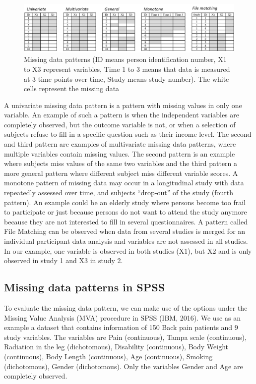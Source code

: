 \documentclass[]{book}
\theoremstyle{definition}
\theoremstyle{definition}
\theoremstyle{definition}
\theoremstyle{remark}
\begin{document}
\begin{figure}

{\centering \includegraphics[width=0.9\linewidth]{images/fig2.2} 

}

\caption{Missing data patterns (ID means person identification number, X1 to X3 represent variables, Time 1 to 3 means that data is measured at 3 time points over time, Study means study number). The white cells represent the missing data}\label{fig:fig2-2}
\end{figure}

A univariate missing data pattern is a pattern with missing values in
only one variable. An example of such a pattern is when the independent
variables are completely observed, but the outcome variable is not, or
when a selection of subjects refuse to fill in a specific question such
as their income level. The second and third pattern are examples of
multivariate missing data patterns, where multiple variables contain
missing values. The second pattern is an example where subjects miss
values of the same two variables and the third pattern a more general
pattern where different subject miss different variable scores. A
monotone pattern of missing data may occur in a longitudinal study with
data repeatedly assessed over time, and subjects ``drop-out'' of the
study (fourth pattern). An example could be an elderly study where
persons become too frail to participate or just because persons do not
want to attend the study anymore because they are not interested to fill
in several questionnaires. A pattern called File Matching can be
observed when data from several studies is merged for an individual
participant data analysis and variables are not assessed in all studies.
In our example, one variable is observed in both studies (X1), but X2
and is only observed in study 1 and X3 in study 2.

\subsection{Missing data patterns in
SPSS}\label{missing-data-patterns-in-spss}

To evaluate the missing data pattern, we can make use of the options
under the Missing Value Analysis (MVA) procedure in SPSS (IBM, 2016). We
use as an example a dataset that contains information of 150 Back pain
patients and 9 study variables. The variables are Pain (continuous),
Tampa scale (continuous), Radiation in the leg (dichotomous), Disability
(continuous), Body Weight (continuous), Body Length (continuous), Age
(continuous), Smoking (dichotomous), Gender (dichotomous). Only the
variables Gender and Age are completely observed.
\end{document}
